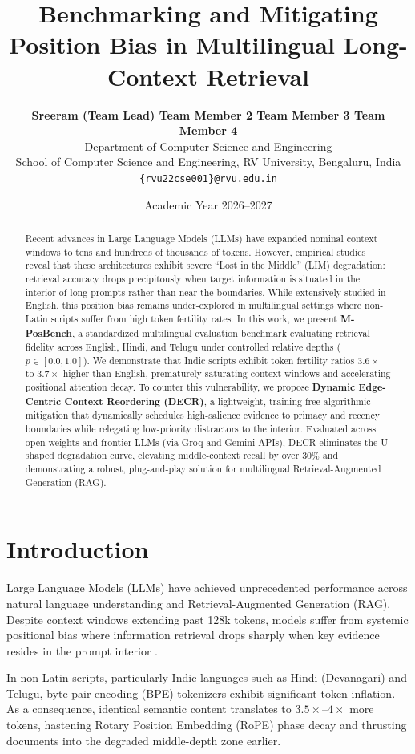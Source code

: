 \documentclass[11pt,a4paper]{article}
\title{\textbf{Benchmarking and Mitigating Position Bias in Multilingual Long-Context Retrieval}}
\author{
  \textbf{Sreeram (Team Lead) \quad Team Member 2 \quad Team Member 3 \quad Team Member 4} \\
  Department of Computer Science and Engineering \\
  School of Computer Science and Engineering, RV University, Bengaluru, India \\
  \texttt{\{rvu22cse001\}@rvu.edu.in}
}
\date{Academic Year 2026--2027}
\begin{document}
\maketitle

\begin{abstract}
Recent advances in Large Language Models (LLMs) have expanded nominal context windows to tens and hundreds of thousands of tokens. However, empirical studies reveal that these architectures exhibit severe ``Lost in the Middle'' (LIM) degradation: retrieval accuracy drops precipitously when target information is situated in the interior of long prompts rather than near the boundaries. While extensively studied in English, this position bias remains under-explored in multilingual settings where non-Latin scripts suffer from high token fertility rates. In this work, we present \textbf{M-PosBench}, a standardized multilingual evaluation benchmark evaluating retrieval fidelity across English, Hindi, and Telugu under controlled relative depths ($p \in [0.0, 1.0]$). We demonstrate that Indic scripts exhibit token fertility ratios $3.6\times$ to $3.7\times$ higher than English, prematurely saturating context windows and accelerating positional attention decay. To counter this vulnerability, we propose \textbf{Dynamic Edge-Centric Context Reordering (DECR)}, a lightweight, training-free algorithmic mitigation that dynamically schedules high-salience evidence to primacy and recency boundaries while relegating low-priority distractors to the interior. Evaluated across open-weights and frontier LLMs (via Groq and Gemini APIs), DECR eliminates the U-shaped degradation curve, elevating middle-context recall by over 30\% and demonstrating a robust, plug-and-play solution for multilingual Retrieval-Augmented Generation (RAG).
\end{abstract}

\section{Introduction}
Large Language Models (LLMs) have achieved unprecedented performance across natural language understanding and Retrieval-Augmented Generation (RAG). Despite context windows extending past 128k tokens, models suffer from systemic positional bias where information retrieval drops sharply when key evidence resides in the prompt interior \cite{liu2024lost}.

In non-Latin scripts, particularly Indic languages such as Hindi (Devanagari) and Telugu, byte-pair encoding (BPE) tokenizers exhibit significant token inflation. As a consequence, identical semantic content translates to $3.5\times$--$4\times$ more tokens, hastening Rotary Position Embedding (RoPE) phase decay and thrusting documents into the degraded middle-depth zone earlier.
\end{document}
